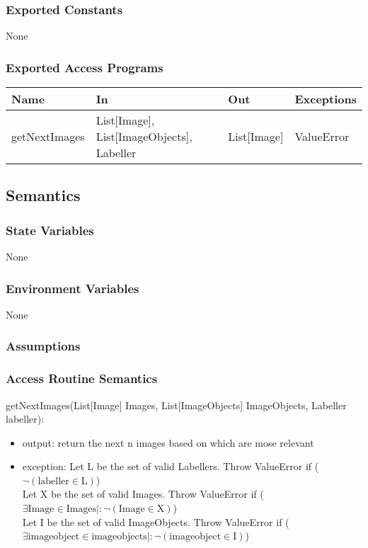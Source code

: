 \documentclass[12pt, titlepage]{article}
\begin{document}
  
  \subsubsection{Exported Constants}
  None
  \subsubsection{Exported Access Programs}
  
  \begin{center}
  \begin{tabular}{p{2cm} p{4cm} p{4cm} p{2cm}}
  \hline
  \textbf{Name} & \textbf{In} & \textbf{Out} & \textbf{Exceptions} \\
  \hline
  getNextImages & List[Image], List[ImageObjects], Labeller & List[Image] & ValueError \\
  
  \end{tabular}
  \end{center}
  
  \subsection{Semantics}
  
  \subsubsection{State Variables}
  
 None
  
  \subsubsection{Environment Variables}
  
  None
  
  \subsubsection{Assumptions}
  
  
  \subsubsection{Access Routine Semantics}
  
  \noindent getNextImages(List[Image] Images, List[ImageObjects] ImageObjects, Labeller labeller):
  \begin{itemize}
  \item output: return the next n images based on which are mose relevant
  \item exception: Let L be the set of valid Labellers. Throw ValueError if ($ \neg (\text{labeller} \in \text{L})$)\\
  Let X be the set of valid Images. Throw ValueError if ($\exists \text{Image} \in \text{Images} |: \neg (\text{Image} \in \text{X})$)\\
  Let I be the set of valid ImageObjects. Throw ValueError if ($\exists \text{imageobject} \in \text{imageobjects} |: \neg (\text{imageobject} \in \text{I})$)\\
  \end{itemize}
\end{document}
